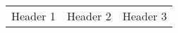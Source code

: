 \documentclass{article}
\newcommand\WeaponsHeld{}
\begin{document}
\begin{table}[htp]
  \centering
  \begin{tabular}{ c c c }

    Header 1 & Header 2 & Header 3 \\ %
    \WeaponsHeld

  \end{tabular}
\end{table}
\end{document}
